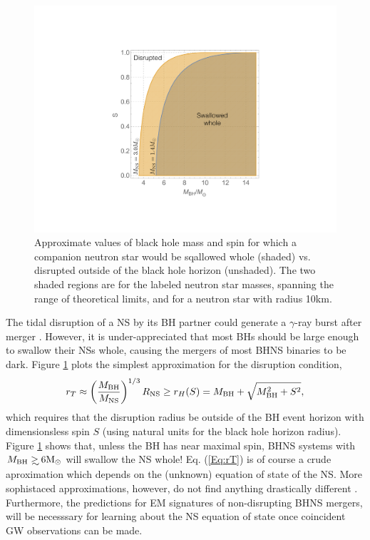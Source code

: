 \begin{figure}
\begin{center}
\includegraphics[scale=0.33]{figures/ch0/BHNS_TDs} 
\end{center}
\caption{Approximate values of black hole mass and spin for which a companion neutron star would be sqallowed whole (shaded) vs. disrupted outside of the black hole horizon (unshaded). The two shaded regions are for the labeled neutron star masses, spanning the range of theoretical limits, and for a neutron star with radius 10km.}
\label{Fig:NSBH_TDs}
\end{figure}

The tidal disruption of a NS by its BH partner could generate a $\gamma$-ray
burst after merger \citep{NPP:NSBH_GRB:1992}. However, it is under-appreciated
that most BHs should be large enough to swallow their NSs
whole, causing the mergers of most BHNS binaries to be dark. Figure 
\ref{Fig:NSBH_TDs} plots the simplest approximation for the disruption condition,
\begin{equation}
 r_T \approx \left( \frac{M_{\rm{BH}} }{ M_{\rm{NS}}} \right)^{1/3} R_{\rm{NS}} \geq r_H(S) 
 = M_{\rm{BH}} + \sqrt{M^2_{\rm{BH}} + S^2},
 \label{Eq:rT}
\end{equation}
which requires that the disruption radius be outside of the BH event horizon
with dimensionsless spin $S$ (using natural units for the black hole horizon
radius). Figure \ref{Fig:NSBH_TDs} shows that, unless the BH has near maximal
spin, BHNS systems with $M_{\rm{BH}} \gsim 6 \msun$ will swallow the NS whole!
Eq. (\ref{Eq:rT}) is of course a crude aproximation which depends on the
(unknown) equation of state of the NS. More sophistaced approximations,
however, do not find anything drastically different
\citep[\emph{e.g.}][]{Foucart:2012}. Furthermore, the predictions for EM
signatures of non-disrupting BHNS mergers, will be necesssary for learning
about the NS equation of state once coincident GW observations can be made.


